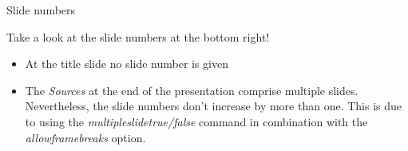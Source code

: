 \begin{frame}{Slide numbers}

  Take a look at the slide numbers at the bottom right! 

  \begin{itemize}
    \item At the title slide no slide number is given
    \item The \textit{Sources} at the end of the presentation
          comprise multiple slides. Nevertheless, the slide 
          numbers don't increase by more than one. This is due
          to using the \textit{multipleslidetrue/false} command
          in combination with the \textit{allowframebreaks}
          option.
  \end{itemize}

\end{frame}